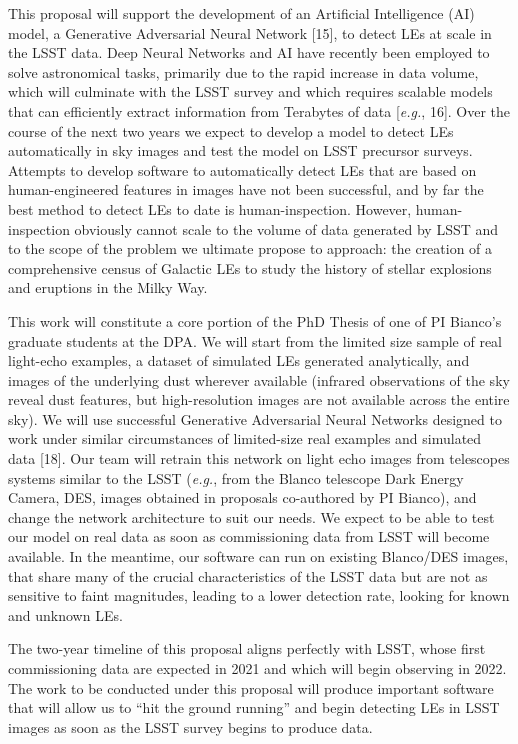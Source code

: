 \documentclass{proposalnsf}
\newcommand{\eg}{\emph{e.g.}}
\begin{document}
This proposal will support the development of an Artificial Intelligence (AI) model, a Generative Adversarial Neural Network [15], to detect LEs at scale in the LSST data.   Deep Neural Networks and AI have recently been employed to solve astronomical tasks, primarily due to the rapid increase in data volume, which will culminate with the LSST survey and which requires scalable models that can efficiently extract information from Terabytes of data [\eg,  16].   Over the course of the next two years we expect to develop a model to detect LEs automatically in sky images and test the model on LSST precursor surveys.   Attempts to develop software to automatically detect LEs that are based on human-engineered features in images have not been successful, and by far the best method to detect LEs to date is human-inspection.  However, human-inspection obviously cannot scale to the volume of data generated by LSST and to the scope of the problem we ultimate propose to approach: the creation of a comprehensive census of Galactic LEs to study the history of stellar explosions and eruptions in the Milky Way.   

This work will constitute a core portion of the PhD Thesis of one of PI Bianco’s graduate students at the DPA.   We will start from the limited size sample of real light-echo examples, a dataset of simulated LEs generated analytically, and images of the underlying dust wherever available (infrared observations of the sky reveal dust features, but high-resolution images are not available across the entire sky).   We will use successful Generative Adversarial Neural Networks designed to work under similar circumstances of limited-size real examples and simulated data [18].   Our team will retrain this network on light echo images from telescopes systems similar to the LSST (\eg,  from the Blanco telescope Dark Energy Camera, DES, images obtained in proposals co-authored by PI Bianco), and change the network architecture to suit our needs.  We expect to be able to test our model on real data as soon as commissioning data from LSST will become available.   In the meantime, our software can run on existing Blanco/DES images, that share many of the crucial characteristics of the LSST data but are not as sensitive to faint magnitudes, leading to a lower detection rate, looking for known and unknown LEs.


The two-year timeline of this proposal aligns perfectly with LSST, whose first commissioning data are expected in 2021 and which will begin observing in 2022.   The work to be conducted under this proposal will produce important software that will allow us to ``hit the ground running'' and begin detecting LEs in LSST images as soon as the LSST survey begins to produce data.  
\end{document}
